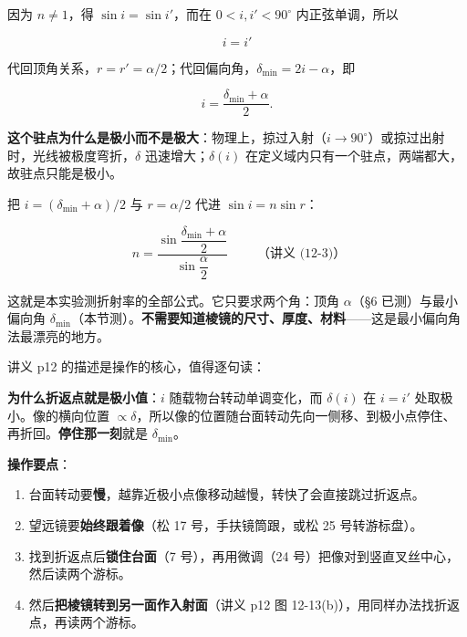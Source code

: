 \documentclass[11pt]{ctexart}
\begin{document}
因为 $n\neq1$，得 $\sin i=\sin i'$，而在 $0<i,i'<90^{\circ}$ 内正弦单调，所以

\[
\boxed{\,i=i'\,}
\]

代回顶角关系，$r=r'=\alpha/2$；代回偏向角，$\delta_{\min}=2i-\alpha$，即

\[
i=\frac{\delta_{\min}+\alpha}{2}.
\]

\textbf{这个驻点为什么是极小而不是极大}：物理上，掠过入射（$i\to90^{\circ}$）或掠过出射时，光线被极度弯折，$\delta$ 迅速增大；$\delta(i)$ 在定义域内只有一个驻点，两端都大，故驻点只能是极小。


把 $i=(\delta_{\min}+\alpha)/2$ 与 $r=\alpha/2$ 代进 $\sin i=n\sin r$：

\[
\boxed{\;
n=\frac{\sin\dfrac{\delta_{\min}+\alpha}{2}}{\sin\dfrac{\alpha}{2}}
\;}
\qquad\text{（讲义 (12-3)）}
\]

这就是本实验测折射率的全部公式。它只要求两个角：顶角 $\alpha$（§6 已测）与最小偏向角 $\delta_{\min}$（本节测）。\textbf{不需要知道棱镜的尺寸、厚度、材料}——这是最小偏向角法最漂亮的地方。


讲义 p12 的描述是操作的核心，值得逐句读：


\textbf{为什么折返点就是极小值}：$i$ 随载物台转动单调变化，而 $\delta(i)$ 在 $i=i'$ 处取极小。像的横向位置 $\propto\delta$，所以像的位置随台面转动先向一侧移、到极小点停住、再折回。\textbf{停住那一刻}就是 $\delta_{\min}$。

\textbf{操作要点}：

\begin{enumerate}[label=(\arabic*)]
\item 台面转动要\textbf{慢}，越靠近极小点像移动越慢，转快了会直接跳过折返点。
\item 望远镜要\textbf{始终跟着像}（松 17 号，手扶镜筒跟，或松 25 号转游标盘）。
\item 找到折返点后\textbf{锁住台面}（7 号），再用微调（24 号）把像对到竖直叉丝中心，然后读两个游标。
\item 然后\textbf{把棱镜转到另一面作入射面}（讲义 p12 图 12-13(b)），用同样办法找折返点，再读两个游标。
\end{enumerate}
\end{document}
